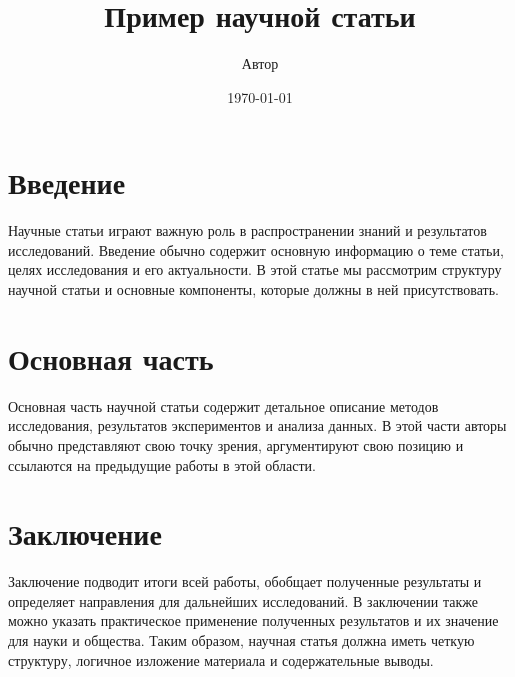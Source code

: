 \documentclass{article}
\title{Пример научной статьи}
\author{Автор}
\date{\today}
\begin{document}
\maketitle

\section{Введение}
Научные статьи играют важную роль в распространении знаний и результатов исследований. 
Введение обычно содержит основную информацию о теме статьи, целях исследования и его актуальности. 
В этой статье мы рассмотрим структуру научной статьи и основные компоненты, которые должны в ней присутствовать.

\section{Основная часть}
Основная часть научной статьи содержит детальное описание методов исследования, 
результатов экспериментов и анализа данных. В этой части авторы обычно представляют 
свою точку зрения, аргументируют свою позицию и ссылаются на предыдущие работы в этой области.

\section{Заключение}
Заключение подводит итоги всей работы, обобщает полученные результаты и 
определяет направления для дальнейших исследований. В заключении также 
можно указать практическое применение полученных результатов и их значение 
для науки и общества. Таким образом, научная статья должна иметь четкую 
структуру, логичное изложение материала и содержательные выводы.
\end{document}
